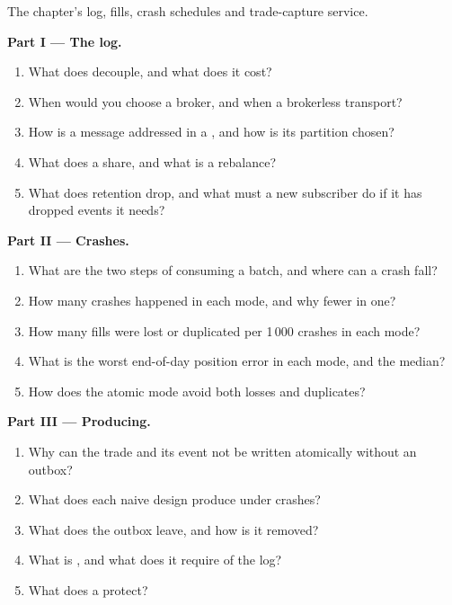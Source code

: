 \begin{problem}\label{pb:pl:messaging-and-event-driven-architecture:1}
The chapter's log, fills, crash schedules and trade-capture service.

\medskip\noindent\textbf{Part I --- The log.}
\begin{enumerate}
\item What does  decouple, and what does it cost?
\item When would you choose a broker, and when a brokerless transport?
\item How is a message addressed in a , and how is its partition chosen?
\item What does a  share, and what is a rebalance?
\item What does retention drop, and what must a new subscriber do if it has dropped events it needs?
\end{enumerate}

\medskip\noindent\textbf{Part II --- Crashes.}
\begin{enumerate}[resume]
\item What are the two steps of consuming a batch, and where can a crash fall?
\item How many crashes happened in each mode, and why fewer in one?
\item How many fills were lost or duplicated per 1\,000 crashes in each mode?
\item What is the worst end-of-day position error in each mode, and the median?
\item How does the atomic mode avoid both losses and duplicates?
\end{enumerate}

\medskip\noindent\textbf{Part III --- Producing.}
\begin{enumerate}[resume]
\item Why can the trade and its event not be written atomically without an outbox?
\item What does each naive design produce under crashes?
\item What does the outbox leave, and how is it removed?
\item What is , and what does it require of the log?
\item What does a  protect?
\end{enumerate}


\end{problem}
